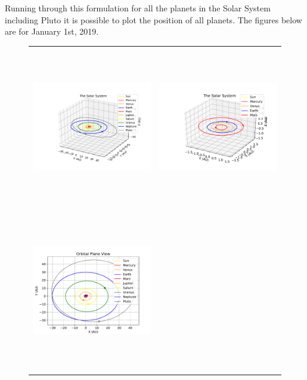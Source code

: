 \documentclass{article}
\begin{document}
Running through this formulation for all the planets in the Solar
System including Pluto it is possible to plot the position of all
planets. The figures below are for January 1st, 2019.
\begin{figure}[H]
  \begin{center}
  \begin{tabular}{cc}
  \includegraphics[height=70mm, width=80mm]{Figures/all_planets_isometric.pdf}&
  \includegraphics[height=70mm, width=80mm]{Figures/inner_planets_isometric.pdf}\\
  \includegraphics[height=70mm, width=80mm]{Figures/top_down_view_all_planets.pdf}&

\end{tabular}
\end{center}
\end{figure}
\end{document}
